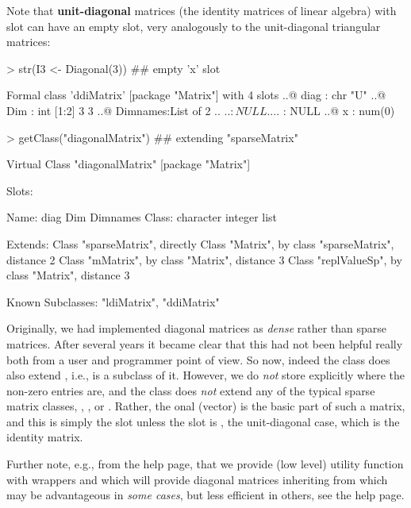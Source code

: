 \documentclass{article}
\begin{document}
Note that \textbf{unit-diagonal} matrices (the identity matrices of linear algebra)
with slot  can have an empty  slot, very
analogously to the unit-diagonal triangular matrices:
\begin{Schunk}
\begin{Sinput}
> str(I3 <- Diagonal(3)) ## empty 'x' slot
\end{Sinput}
\begin{Soutput}
Formal class 'ddiMatrix' [package "Matrix"] with 4 slots
  ..@ diag    : chr "U"
  ..@ Dim     : int [1:2] 3 3
  ..@ Dimnames:List of 2
  .. ..$ : NULL
  .. ..$ : NULL
  ..@ x       : num(0) 
\end{Soutput}
\begin{Sinput}
> getClass("diagonalMatrix") ## extending "sparseMatrix"
\end{Sinput}
\begin{Soutput}
Virtual Class "diagonalMatrix" [package "Matrix"]

Slots:
                                    
Name:       diag       Dim  Dimnames
Class: character   integer      list

Extends: 
Class "sparseMatrix", directly
Class "Matrix", by class "sparseMatrix", distance 2
Class "mMatrix", by class "Matrix", distance 3
Class "replValueSp", by class "Matrix", distance 3

Known Subclasses: "ldiMatrix", "ddiMatrix"
\end{Soutput}
\end{Schunk}
Originally, we had implemented diagonal matrices as \emph{dense} rather than sparse
matrices.  After several years it became clear that this had not been
helpful really both from a user and programmer point of view.
So now, indeed the  class does also extend
, i.e., is a subclass of it.
However, we do \emph{not} store explicitly
where the non-zero entries are, and the class does \emph{not} extend any of
the typical sparse matrix classes, ,
, or .
Rather, the onal (vector) is the basic part of such a matrix,
and this is simply the  slot unless the  slot is ,
the unit-diagonal case, which is the identity matrix.

Further note, e.g., from the  help page, that we provide
(low level) utility function
 with wrappers
 and  which will provide diagonal
matrices inheriting from  which may be advantageous
in \emph{some cases}, but less efficient in others, see the help page.
\end{document}
